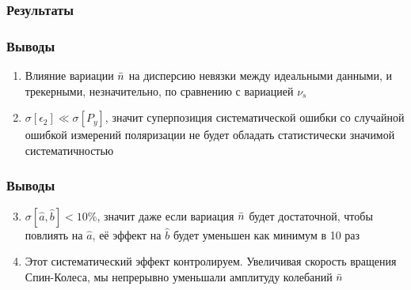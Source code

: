 \documentclass[14pt]{beamer}
\begin{document}
\begin{frame}\frametitle{Результаты}
\end{frame}
\begin{frame}\frametitle{Выводы}
	\begin{enumerate}
		\item Влияние вариации $\bar n$ на дисперсию невязки между идеальными данными, и трекерными, незначительно, по сравнению с вариацией $\nu_s$
		\item $\sigma[\epsilon_2] \ll \sigma[P_y]$, значит суперпозиция систематической ошибки со случайной ошибкой измерений поляризации не будет обладать статистически значимой систематичностью
	\end{enumerate}
\end{frame}
\begin{frame}\frametitle{Выводы}
	\begin{enumerate} \setcounter{enumi}{2}
		\item $\sigma[\hat a, \hat b] < 10\%$, значит даже если вариация $\bar n$ будет достаточной, чтобы повлиять на $\hat a$, её эффект на $\hat b$ будет уменьшен как минимум в 10 раз
		\item Этот систематический эффект контролируем. Увеличивая скорость вращения Спин-Колеса, мы непрерывно уменьшали амплитуду колебаний $\bar n$
	\end{enumerate}
\end{frame}
\end{document}
